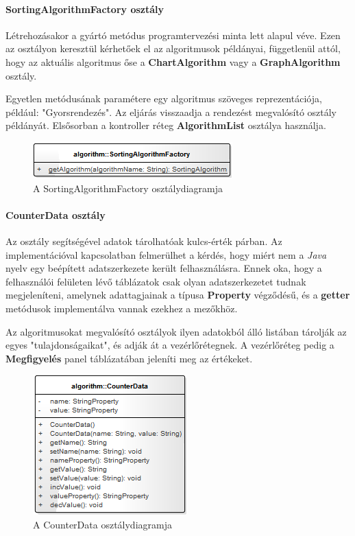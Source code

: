 \documentclass{elteikthesis}
\begin{document}
\paragraph{SortingAlgorithmFactory osztály}
Létrehozásakor a gyártó metódus programtervezési minta lett alapul véve. Ezen az osztályon keresztül kérhetőek el az algoritmusok példányai, függetlenül attól, hogy az aktuális algoritmus őse a \textbf{ChartAlgorithm} vagy a \textbf{GraphAlgorithm} osztály.\par
Egyetlen metódusának paramétere egy algoritmus szöveges reprezentációja, például: "Gyorsrendezés". Az eljárás visszaadja a rendezést megvalósító osztály példányát. Elsősorban a kontroller réteg \textbf{AlgorithmList} osztálya használja.
\begin{figure}[H]
	\centering
	\includegraphics{pics/class/SortingAlgorithmFactory.png}
	\caption{A SortingAlgorithmFactory osztálydiagramja}
\end{figure}
\paragraph{CounterData osztály}
Az osztály segítségével adatok tárolhatóak kulcs-érték párban. Az implementációval kapcsolatban felmerülhet a kérdés, hogy miért nem a \emph{Java} nyelv egy beépített adatszerkezete került felhasználásra. Ennek oka, hogy a felhasználói felületen lévő táblázatok csak olyan adatszerkezetet tudnak megjeleníteni, amelynek adattagjainak a típusa \textbf{Property} végződésű, és a \textbf{getter} metódusok implementálva vannak ezekhez a mezőkhöz.\par
 Az algoritmusokat megvalósító osztályok ilyen adatokból álló listában tárolják az egyes "tulajdonságaikat", és adják át a vezérlőrétegnek. A vezérlőréteg pedig a \textbf{Megfigyelés} panel táblázatában jeleníti meg az értékeket.
\begin{figure}[H]
	\centering
	\includegraphics{pics/class/CounterData.png}
	\caption{A CounterData osztálydiagramja}
\end{figure}
\end{document}
